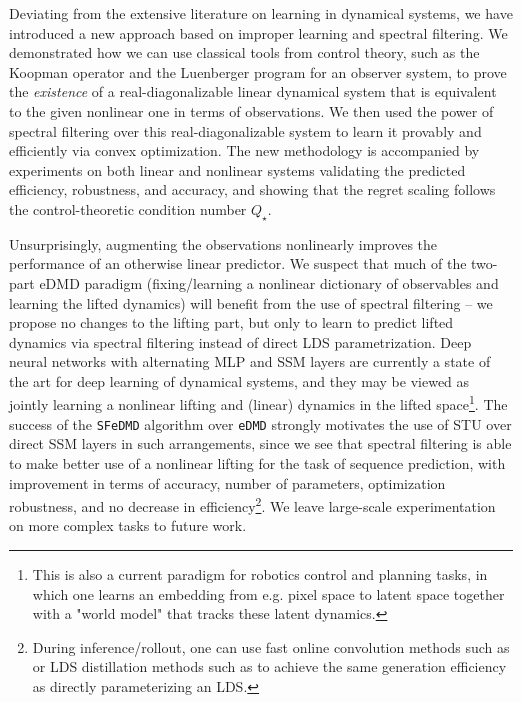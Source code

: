 \documentclass[11pt]{article}
\numberwithin{equation}{section}
\begin{document}
Deviating from the extensive literature on learning in dynamical systems, we have introduced a new approach based on improper learning and spectral filtering. We demonstrated how we can use classical tools from control theory, such as the Koopman operator and the Luenberger program for an observer system, to prove the {\it existence} of a real-diagonalizable linear dynamical system that is equivalent to the given nonlinear one in terms of observations. We then used the power of spectral filtering over this real-diagonalizable system to learn it provably and efficiently via convex optimization. 
The new methodology is accompanied by experiments on both linear and nonlinear systems validating the predicted efficiency, robustness, and accuracy, and showing that the regret scaling follows the control-theoretic condition number $Q_\star$.
 
Unsurprisingly, augmenting the observations nonlinearly improves the performance of an otherwise linear predictor. 
We suspect that much of the two-part eDMD paradigm (fixing/learning a nonlinear dictionary of observables and learning the lifted dynamics) will benefit from the use of spectral filtering -- we propose no changes to the lifting part, but only to learn to predict lifted dynamics via spectral filtering instead of direct LDS parametrization.
Deep neural networks with alternating MLP and SSM layers are currently a state of the art for deep learning of dynamical systems, and they may be viewed as jointly learning a nonlinear lifting and (linear) dynamics in the lifted space\footnote{This is also a current paradigm for robotics control and planning tasks, in which one learns an embedding from e.g. pixel space to latent space together with a "world model" that tracks these latent dynamics.}. 
The success of the \verb|SFeDMD| algorithm over \verb|eDMD| strongly motivates the use of STU \cite{liu2024flash} over direct SSM layers in such arrangements, since we see that spectral filtering is able to make better use of a nonlinear lifting for the task of sequence prediction, with improvement in terms of accuracy, number of parameters, optimization robustness, and no decrease in efficiency\footnote{During inference/rollout, one can use fast online convolution methods such as \cite{agarwal2024futurefillfastgenerationconvolutional} or LDS distillation methods such as \cite{shah2025spectraldsprovabledistillationlinear} to achieve the same generation efficiency as directly parameterizing an LDS.}. We leave large-scale experimentation on more complex tasks to future work.
\end{document}
